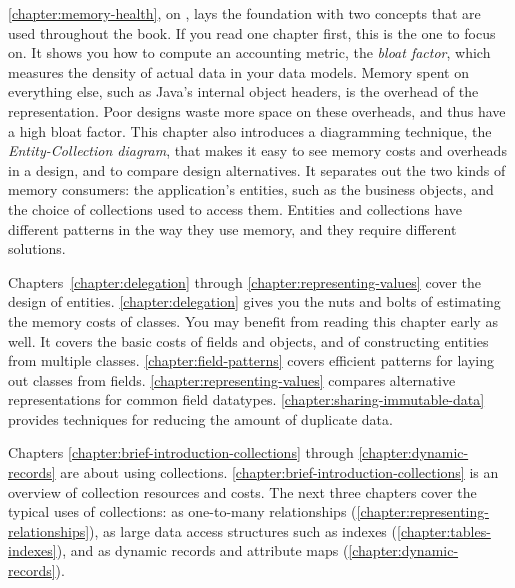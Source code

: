 \autoref{chapter:memory-health}, on , lays the
foundation with two concepts that are used throughout the book. If you read one chapter first,
this is the one to focus on.
It shows you how to compute an accounting metric,
the \emph{bloat factor}, which measures the density of actual data in your
data models. Memory spent on everything else, such as
Java's internal object headers, is the overhead of the representation.
Poor designs waste more space on these overheads, and thus have a high bloat
factor. This chapter also introduces a diagramming technique,
the \emph{Entity-Collection diagram}, that makes it easy to see memory costs and
overheads in a design, and to compare design alternatives.
It separates out the two kinds of memory consumers:
%
the application's entities, such as the
business objects, and the choice of collections used to access them. Entities and collections have
different patterns in the way they use memory, and they require different solutions.

Chapters~\ref{chapter:delegation} through
\ref{chapter:representing-values} cover the design of
entities. \autoref{chapter:delegation} gives you the nuts and bolts of
estimating the memory costs of classes. You may benefit from reading this chapter early as
well. It covers the basic costs of fields and objects, and of constructing
entities from multiple classes.
\autoref{chapter:field-patterns} covers efficient patterns for laying out classes from fields.
\autoref{chapter:representing-values} compares alternative representations for common field datatypes. 
\autoref{chapter:sharing-immutable-data} provides techniques for
reducing the amount of duplicate data.

Chapters \ref{chapter:brief-introduction-collections} through
\ref{chapter:dynamic-records} are about
using collections. \autoref{chapter:brief-introduction-collections} is
an overview of collection resources and costs.
The next three chapters cover the typical uses of collections:
as one-to-many relationships (\autoref{chapter:representing-relationships}),
as large data access structures such as indexes
(\autoref{chapter:tables-indexes}), and as dynamic records and attribute maps
(\autoref{chapter:dynamic-records}).

